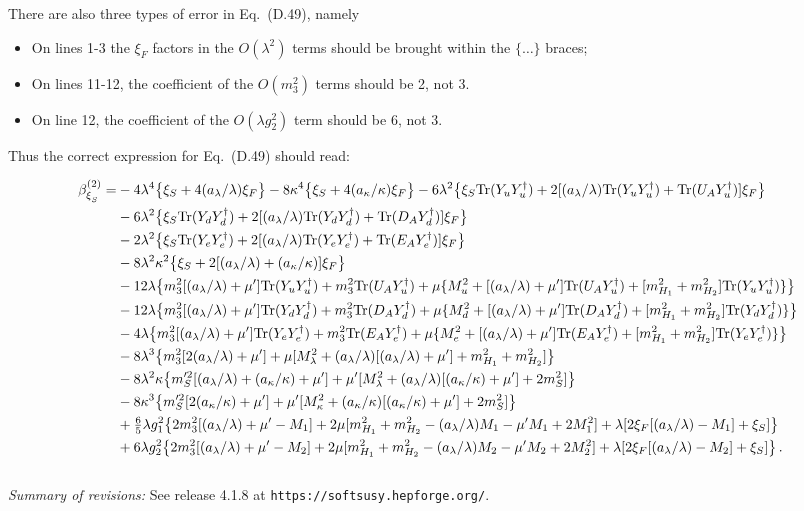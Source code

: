 \documentclass[final,3p,times,pdflatex]{elsarticle}
\newcommand{\lamsq}{\lambda^2}
\newcommand{\kapsq}{\kappa^2}
\newcommand{\tr}{\mathrm{Tr}}
\newcommand{\mhusq}{m^2_{H_2}}
\newcommand{\mhdsq}{m^2_{H_1}}
\newcommand{\mlamsq}{M_\lambda^2}
\newcommand{\mkapsq}{M_\kappa^2}
\newcommand{\mssq}{m_S^2}
\newcommand{\mtrisq}{m_3^2}
\newcommand{\msprsq}{m_S'^2}
\newcommand{\Alam}{a_\lambda/\lambda}
\newcommand{\Akap}{a_\kappa/\kappa}
\newcommand{\Musq}{M_u^2}
\newcommand{\Mdsq}{M_d^2}
\newcommand{\Mesq}{M_e^2}
\begin{document}
There are also three types of error in Eq.\ (D.49), namely

\begin{itemize}
  \item On lines 1-3 the $\xi_F$ factors in the $O(\lambda^2)$ terms should be brought within the $\{\ldots \}$ braces;
  \item On lines 11-12, the coefficient of the $O(m_3^2)$ terms should be 2, not 3.
  \item On line 12, the coefficient of the $O(\lambda g_2^2)$ term should be 6, not 3.
\end{itemize}

Thus the correct expression for Eq.\ (D.49) should read:

\begin{align}
  \beta_{\xi^{}_S}^{(2)} =& -4\lambda^4\big\{ \xi_S + 4(\Alam)\xi_F\big\}
  - 8\kappa^4\big\{ \xi_S + 4(\Akap)\xi_F\big\}
  -6\lamsq\big\{ \xi_S\tr( Y_u Y_u^\dagger)+ 2[(\Alam)\tr( Y_u Y_u^\dagger) + \tr( U_A Y_u^\dagger)] \xi_F \big\} \notag \\
  &-6\lamsq\big\{\xi_S\tr( Y_d Y_d^\dagger) + 2[(\Alam)\tr( Y_d Y_d^\dagger) + \tr( D_A Y_d^\dagger)] \xi_F\big\}  \notag \\
  &-2\lamsq\big\{\xi_S\tr( Y_e Y_e^\dagger) + 2[(\Alam)\tr( Y_e Y_e^\dagger) + \tr( E_A Y_e^\dagger)] \xi_F \big\} \notag \\
  &-8\lamsq\kapsq\big\{ \xi_S + 2[(\Alam) + (\Akap)]\xi_F\big\} \notag \\
  &-12\lambda\big\{ \mtrisq[(\Alam) + \mu']\tr( Y_u Y_u^\dagger) + \mtrisq\tr( U_A Y_u^\dagger)
  + \mu\{\Musq + [(\Alam) + \mu']\tr( U_A Y_u^\dagger) + [\mhdsq + \mhusq]\tr( Y_u Y_u^\dagger)\} \big\} \notag \\
  &-12\lambda\big\{ \mtrisq[(\Alam) + \mu']\tr( Y_d Y_d^\dagger) + \mtrisq\tr( D_A Y_d^\dagger)
  + \mu\{\Mdsq + [(\Alam) +\mu']\tr( D_A Y_d^\dagger) + [\mhdsq + \mhusq]\tr( Y_d Y_d^\dagger)\} \big\}  \notag \\
  &-4\lambda\big\{ \mtrisq[(\Alam)+ \mu']\tr( Y_e Y_e^\dagger) + \mtrisq\tr( E_A Y_e^\dagger)
  + \mu\{\Mesq + [(\Alam) +\mu']\tr( E_A Y_e^\dagger) + [\mhdsq + \mhusq]\tr( Y_e Y_e^\dagger)\} \big\} \notag \\
  &-8\lambda^3\big\{ \mtrisq[2(\Alam) + \mu'] + \mu[\mlamsq + (\Alam)[(\Alam) + \mu'] + \mhdsq + \mhusq]\big\} \notag \\
  &-8\lamsq\kappa\big\{ \msprsq[(\Alam) + (\Akap) + \mu']
  + \mu'[\mlamsq + (\Alam)[(\Akap) + \mu'] + 2\mssq] \big\} \notag \\
  &-8\kappa^3\big\{ \msprsq[2(\Akap) + \mu']
  + \mu'[\mkapsq + (\Akap)[(\Akap) + \mu'] + 2\mssq] \big\} \notag \\
  &+ \tfrac{6}{5}\lambda g_1^2\big\{ 2\mtrisq[(\Alam) + \mu' - M_1]
  + 2\mu[\mhdsq + \mhusq -(\Alam)M_1 - \mu' M_1 + 2M_1^2]
  + \lambda[2\xi_F[(\Alam) - M_1]  + \xi_S] \big\} \notag \\
  &+6\lambda g_2^2\big\{ 2\mtrisq[(\Alam) + \mu' - M_2]
  + 2\mu[\mhdsq + \mhusq - (\Alam)M_2 - \mu' M_2 + 2M_2^2]
  + \lambda[2\xi_F[(\Alam) - M_2] + \xi_S] \big\}\,.
  \end{align}
\\
{\em Summary of revisions:} See release 4.1.8 at {\tt https://softsusy.hepforge.org/}.
\end{document}
